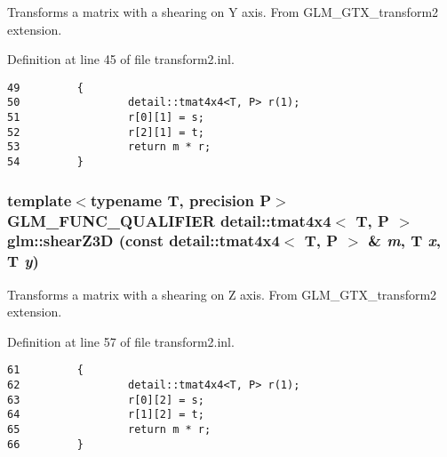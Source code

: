 Transforms a matrix with a shearing on Y axis. From GLM\_\-GTX\_\-transform2 extension. 

Definition at line 45 of file transform2.inl.

\begin{Code}\begin{verbatim}49         {
50                 detail::tmat4x4<T, P> r(1);
51                 r[0][1] = s;
52                 r[2][1] = t;
53                 return m * r;
54         }
\end{verbatim}
\end{Code}


\hypertarget{group__gtx__transform2_ge94300dc2220af5a0d4afa13c912d1a1}{
\subsubsection[shearZ3D]{\setlength{\rightskip}{0pt plus 5cm}template$<$typename T, precision P$>$ GLM\_\-FUNC\_\-QUALIFIER detail::tmat4x4$<$ T, P $>$ glm::shearZ3D (const detail::tmat4x4$<$ T, P $>$ \& {\em m}, \/  T {\em x}, \/  T {\em y})}}
\label{group__gtx__transform2_ge94300dc2220af5a0d4afa13c912d1a1}


Transforms a matrix with a shearing on Z axis. From GLM\_\-GTX\_\-transform2 extension. 

Definition at line 57 of file transform2.inl.

\begin{Code}\begin{verbatim}61         {
62                 detail::tmat4x4<T, P> r(1);
63                 r[0][2] = s;
64                 r[1][2] = t;
65                 return m * r;
66         }
\end{verbatim}
\end{Code}


